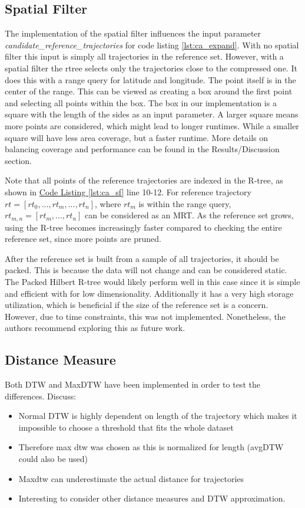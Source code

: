 \subsection{Spatial Filter}
The implementation of the spatial filter influences the input parameter \break \textit{candidate\_reference\_trajectories} for code listing \ref{lst:ca_expand}. With no spatial filter this input is simply all trajectories in the reference set. However, with a spatial filter the rtree selects only the trajectories close to the compressed one. It does this with a range query for latitude and longitude. The point itself is in the center of the range. This can be viewed as creating a box around the first point and selecting all points within the box. The box in our implementation is a square with the length of the sides as an input parameter. A larger square means more points are considered, which might lead to longer runtimes. While a smaller square will have less area coverage, but a faster runtime. More details on balancing coverage and performance can be found in the Results/Discussion section. %

Note that all points of the reference trajectories are indexed in the R-tree, as shown in \hyperref[lst:ca_sf]{Code Listing \ref{lst:ca_sf}} line 10-12. For reference trajectory $rt = [rt_0, ..., rt_m, ..., rt_n]$, where $rt_m$ is within the range query, $rt_{m,n} = [rt_m, ..., rt_n]$ can be considered as an MRT. As the reference set grows, using the R-tree becomes increasingly faster compared to checking the entire reference set, since more points are pruned.

After the reference set is built from a sample of all trajectories, it should be packed. This is because the data will not change and can be considered static. The Packed Hilbert R-tree would likely perform well in this case since it is simple and efficient with for low dimensionality. Additionally it has a very high storage utilization, which is beneficial if the size of the reference set is a concern. However, due to time constraints, this was not implemented. Nonetheless, the authors recommend exploring this as future work.

\subsection{Distance Measure}
Both DTW and MaxDTW have been implemented in order to test the differences. Discuss:
\begin{itemize}
    \item Normal DTW is highly dependent on length of the trajectory which makes it impossible to choose a threshold that fits the whole dataset
    \item Therefore max dtw was chosen as this is normalized for length (avgDTW could also be used)
    \item Maxdtw can underestimate the actual distance for trajectories
    \item Interesting to consider other distance measures and DTW approximation.
\end{itemize}